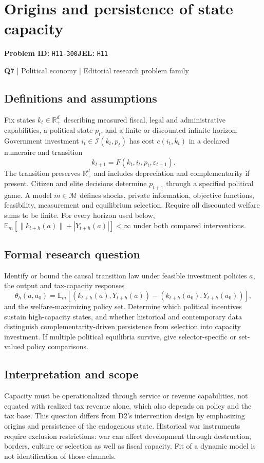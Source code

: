 \documentclass[11pt,a4paper]{article}
\begin{document}
\section*{Origins and persistence of state capacity}
\textbf{Problem ID:} \texttt{H11-300}\quad \textbf{JEL:} \texttt{H11}\par
\label{problem:OP-0127}
\label{atlas:prob:Q7}
{\sffamily\small\color{muted}\textbf{Q7} | Political economy | Editorial research problem family\par}
\subsection*{Definitions and assumptions}
Fix states $k_t\in\mathbb R_+^d$ describing measured fiscal, legal and administrative capabilities, a political state $p_t$, and a finite or discounted infinite horizon. Government investment $i_t\in\mathcal I(k_t,p_t)$ has cost $c(i_t,k_t)$ in a declared numeraire and transition
\[
k_{t+1}=F(k_t,i_t,p_t,\varepsilon_{t+1}).
\]
The transition preserves $\mathbb R_+^d$ and includes depreciation and complementarity if present. Citizen and elite decisions determine $p_{t+1}$ through a specified political game. A model $m\in\mathcal M$ defines shocks, private information, objective functions, feasibility, measurement and equilibrium selection. Require all discounted welfare sums to be finite. For every horizon used below, $\mathbb E_m[\|k_{t+h}(a)\|+|Y_{t+h}(a)|]<\infty$ under both compared interventions.
\subsection*{Formal research question}
Identify or bound the causal transition law under feasible investment policies $a$, the output and tax-capacity responses
\[
\theta_h(a,a_0)=\mathbb E_m[(k_{t+h}(a),Y_{t+h}(a))-(k_{t+h}(a_0),Y_{t+h}(a_0))],
\]
and the welfare-maximizing policy set. Determine which political incentives sustain high-capacity states, and whether historical and contemporary data distinguish complementarity-driven persistence from selection into capacity investment. If multiple political equilibria survive, give selector-specific or set-valued policy comparisons.
\subsection*{Interpretation and scope}
Capacity must be operationalized through service or revenue capabilities, not equated with realized tax revenue alone, which also depends on policy and the tax base. This question differs from D2's intervention design by emphasizing origins and persistence of the endogenous state. Historical war instruments require exclusion restrictions: war can affect development through destruction, borders, culture or selection as well as fiscal capacity. Fit of a dynamic model is not identification of those channels.
\end{document}
